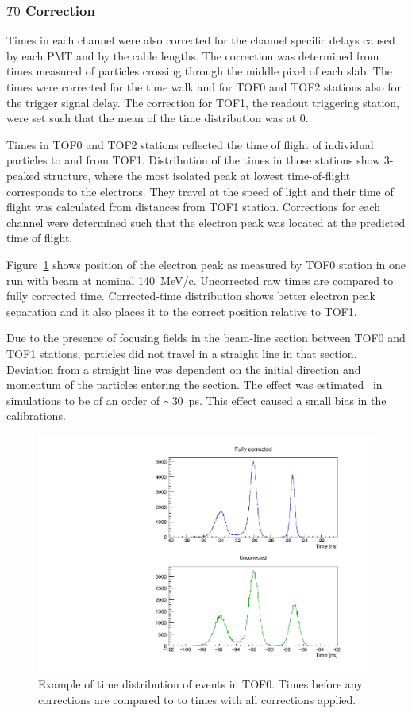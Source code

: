 \subsubsection{$T0$ Correction}

Times in each channel were also corrected for the channel specific
delays caused by each PMT and by the cable lengths. The correction was
determined from times measured of particles crossing through the
middle pixel of each slab. The times were corrected for the time walk
and for TOF0 and TOF2 stations also for the trigger signal delay. The
correction for TOF1, the readout triggering station, were set such
that the mean of the time distribution was at 0.

Times in TOF0 and TOF2 stations reflected the time of flight of
individual particles to and from TOF1. Distribution of the times in
those stations show 3-peaked structure, where the most isolated peak at
lowest time-of-flight corresponds to the electrons. They travel at the
speed of light and their time of flight was calculated from
distances from TOF1 station. Corrections for each channel were
determined such that the electron peak was located at the predicted
time of flight.

Figure~\ref{fig:tof0times} shows position of the electron peak as
measured by TOF0 station in one run with beam at nominal
140~MeV/c. Uncorrected raw times are compared to fully corrected
time. Corrected-time distribution shows better electron peak
separation and it also places it to the correct position relative to
TOF1.

Due to the presence of focusing fields in the beam-line section
between TOF0 and TOF1 stations, particles did not travel in a straight
line in that section. Deviation from a straight line was dependent on
the initial direction and momentum of the particles entering the
section. The effect was estimated~\cite{Rayner:2011zz} in
simulations to be of an order of $\sim$30~ps. This effect caused a
small bias in the calibrations.

\begin{figure}[!ht]
  \centering
  \includegraphics[width=0.8\columnwidth]{04_tof0_corrected_vs_uncorrected}
  \caption{Example of time distribution of events in TOF0. Times
    before any corrections are compared to to times with all
    corrections applied.}
  \label{fig:tof0times}
\end{figure}

